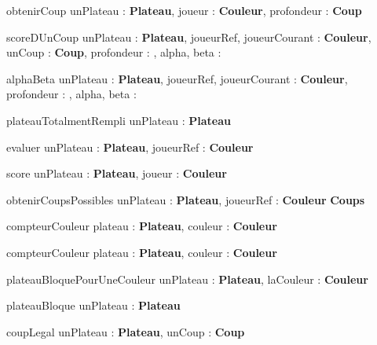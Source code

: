 \documentclass{article}
\begin{document}
	\begin{algorithme}
		\signaturefonction
		{obtenirCoup}
		{unPlateau : \textbf{Plateau}, joueur : \textbf{Couleur}, profondeur : \naturel}
		{\textbf{Coup}}
		
		\vspace{5mm}
		
		
		\signaturefonction
		{scoreDUnCoup}
		{unPlateau : \textbf{Plateau}, joueurRef, joueurCourant : \textbf{Couleur}, unCoup : \textbf{Coup}, profondeur : \naturel, alpha, beta : \entier}
		{\entier}
		
		\vspace{5mm}
		
		
		\signaturefonction
		{alphaBeta}
		{unPlateau : \textbf{Plateau}, joueurRef, joueurCourant : \textbf{Couleur}, profondeur : \naturel, alpha, beta : \entier}
		{\entier}
		
		\vspace{5mm}
		
		
		\signaturefonction
		{plateauTotalmentRempli}
		{unPlateau : \textbf{Plateau}}
		{\booleen}
		
		\vspace{5mm}
		
		
		\signaturefonction
		{evaluer}
		{unPlateau : \textbf{Plateau}, joueurRef : \textbf{Couleur}}
		{\entier}
		
		\vspace{5mm}
		
		
		\signaturefonction
		{score}
		{unPlateau : \textbf{Plateau}, joueur : \textbf{Couleur}}
		{\naturel}
		
		\vspace{5mm}
		
		
		\signaturefonction
		{obtenirCoupsPossibles}
		{unPlateau : \textbf{Plateau}, joueurRef : \textbf{Couleur}}
		{\textbf{Coups}}
		
		\vspace{5mm}
		
		\signaturefonction
		{compteurCouleur}
		{plateau : \textbf{Plateau}, couleur : \textbf{Couleur}}
		{\naturel}
		
		\vspace{5mm}
		
		\signaturefonction
		{compteurCouleur}
		{plateau : \textbf{Plateau}, couleur : \textbf{Couleur}}
		{\naturel}
		
		\vspace{5mm}
		
		\signaturefonction
		{plateauBloquePourUneCouleur}
		{unPlateau : \textbf{Plateau}, laCouleur : \textbf{Couleur}}
		{\booleen}
		
		\vspace{5mm}
		
		\signaturefonction
		{plateauBloque}
		{unPlateau : \textbf{Plateau}}
		{\booleen}
		
		\vspace{5mm}
		
		\signaturefonction
		{coupLegal}
		{unPlateau : \textbf{Plateau}, unCoup : \textbf{Coup}}
		{\booleen}
		
	\end{algorithme}
\end{document}
